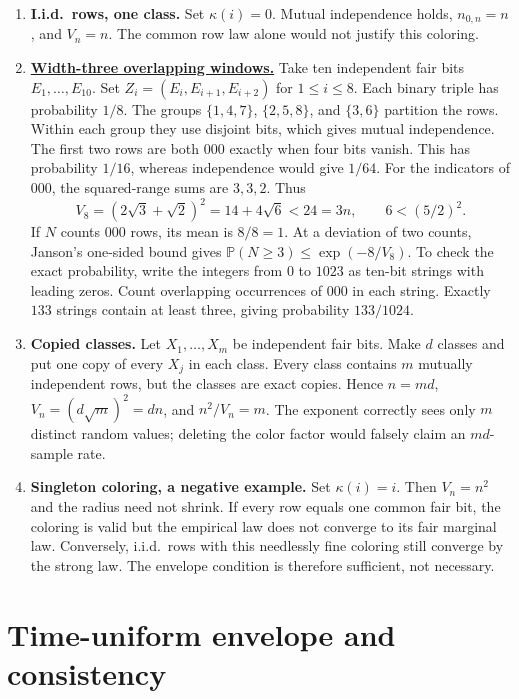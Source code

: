 \documentclass[11pt]{article}
\theoremstyle{definition}
\newcommand{\Prb}{\mathbb{P}}
\begin{document}
\begin{enumerate}[leftmargin=*]
  \item \textbf{I.i.d.\ rows, one class.}  Set $\kappa(i)=0$.  Mutual independence holds,
    $n_{0,n}=n$, and $V_n=n$.  The common row law alone would not justify this coloring.
  \item \textbf{\hyperref[supp:windows]{Width-three overlapping windows.}} Take ten independent
    fair bits $E_1,\ldots,E_{10}$. Set $Z_i=(E_i,E_{i+1},E_{i+2})$ for $1\le i\le8$. Each
    binary triple has probability $1/8$. The groups $\{1,4,7\}$, $\{2,5,8\}$, and $\{3,6\}$
    partition the rows. Within each group they use disjoint bits, which gives mutual
    independence. The first two rows are both $000$ exactly when four bits vanish. This has
    probability $1/16$, whereas independence would give $1/64$. For the indicators of $000$,
    the squared-range sums are $3,3,2$. Thus
    \[
      V_8=(2\sqrt3+\sqrt2)^2=14+4\sqrt6<24=3n,\qquad 6<(5/2)^2.
    \]
    If $N$ counts $000$ rows, its mean is $8/8=1$. At a deviation of two counts, Janson's
    one-sided bound gives $\Prb(N\ge3)\le\exp(-8/V_8)$. To check the exact probability, write
    the integers from $0$ to $1023$ as ten-bit strings with leading zeros. Count overlapping
    occurrences of $000$ in each string. Exactly $133$ strings contain at least three, giving
    probability $133/1024$.

  \item \textbf{Copied classes.}  Let $X_1,\ldots,X_m$ be independent fair bits.  Make $d$
    classes and put one copy of every $X_j$ in each class.  Every class contains $m$ mutually
    independent rows, but the classes are exact copies.  Hence $n=md$,
    $V_n=(d\sqrt m)^2=dn$, and $n^2/V_n=m$.  The exponent correctly sees only $m$ distinct
    random values; deleting the color factor would falsely claim an $md$-sample rate.
  \item \textbf{Singleton coloring, a negative example.}  Set $\kappa(i)=i$.  Then
    $V_n=n^2$ and the radius need not shrink.  If every row equals one common fair bit, the
    coloring is valid but the empirical law does not converge to its fair marginal law.
    Conversely, i.i.d.\ rows with this needlessly fine coloring still converge by the strong law.
    The envelope condition is therefore sufficient, not necessary.
\end{enumerate}

\section{Time-uniform envelope and consistency}
\end{document}

